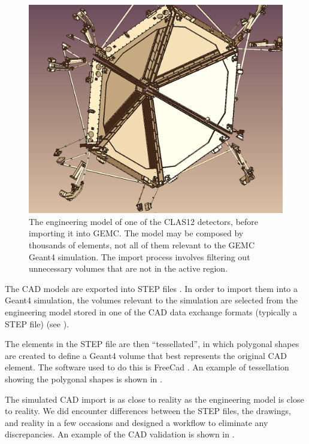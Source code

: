 \begin{figure}[h]
	\centering
	\includegraphics[width=1.0\columnwidth,keepaspectratio]{img/cadSelection.png}
	\caption{ The engineering model of one of the CLAS12 detectors, before importing it into GEMC.
             The model may be composed by thousands of elements, not all of them relevant to the GEMC Geant4 simulation.
             The import process involves filtering out unnecessary volumes that are not in the active region.}
	\label{fig:cadSelection}
\end{figure}

The CAD models are exported into STEP files \cite{stepFiles}.
In order to import them into a Geant4 simulation, the volumes relevant to the simulation are selected from the engineering
model stored in one of the CAD data exchange formats (typically a STEP file) \cite{cadExchange} (see ).


The elements in the STEP file are then ``tessellated'', in which polygonal shapes are created to define a Geant4 volume
that best represents the original CAD element.
The software used to do this is FreeCad \cite{freeCad}. An example of tessellation showing the polygonal shapes
is shown in .

The simulated CAD import is as close to reality as the engineering model is close to reality.
We did encounter differences between the STEP files, the drawings, and reality in a few occasions and designed
a workflow to eliminate any discrepancies.
An example of the CAD validation is shown in .

